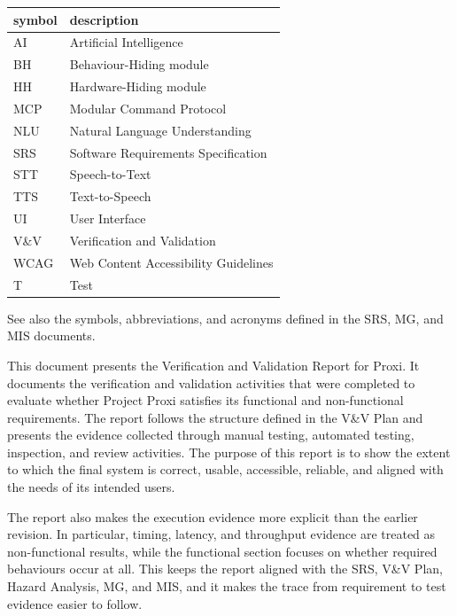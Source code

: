 \documentclass[12pt]{article}
\begin{document}
\begingroup
\renewcommand{\arraystretch}{1.2}
\begin{tabular}{l l}
\toprule
\textbf{symbol} & \textbf{description}\\
\midrule
AI & Artificial Intelligence\\
BH & Behaviour-Hiding module\\
HH & Hardware-Hiding module\\
MCP & Modular Command Protocol\\
NLU & Natural Language Understanding\\
SRS & Software Requirements Specification\\
STT & Speech-to-Text\\
TTS & Text-to-Speech\\
UI & User Interface\\
V\&V & Verification and Validation\\
WCAG & Web Content Accessibility Guidelines\\
T & Test\\
\bottomrule
\end{tabular}

\endgroup

\medskip

\noindent See also the symbols, abbreviations, and acronyms defined in the
SRS, MG,
and MIS documents.

\newpage


\noindent This document presents the Verification and Validation Report for
Proxi. It documents the verification and validation activities that
were completed to evaluate whether Project Proxi satisfies its functional and
non-functional requirements. The report follows the structure defined in the
V\&V Plan and presents the evidence collected through manual testing,
automated testing, inspection, and review activities. The purpose of this
report is to show the extent to which the final system is correct, usable,
accessible, reliable, and aligned with the needs of its intended users.

The report also makes the execution evidence more explicit than the earlier
revision. In particular, timing, latency, and throughput evidence are treated
as non-functional results, while the functional section focuses on whether
required behaviours occur at all. This keeps the report aligned with the SRS,
V\&V Plan, Hazard Analysis, MG, and MIS, and it makes the trace from
requirement to test evidence easier to follow.
\end{document}
